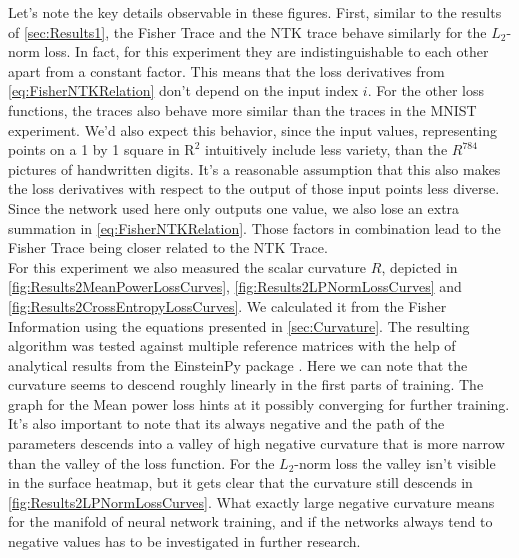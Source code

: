 Let's note the key details observable in these figures. First, similar to the results of \cref{sec:Results1}, the Fisher Trace and the NTK trace behave similarly for the $L_2$-norm loss. In fact, for this experiment they are indistinguishable to each other apart from a constant factor. This means that the loss derivatives from \cref{eq:FisherNTKRelation} don't depend on the input index $i$. For the other loss functions, the traces also behave more similar than the traces in the MNIST experiment. We'd also expect this behavior, since the input values, representing points on a 1 by 1 square in $\mathrm{R}^2$ intuitively include less variety, than the $R^{784}$ pictures of handwritten digits. It's a reasonable assumption that this also makes the loss derivatives with respect to the output of those input points less diverse. Since the network used here only outputs one value, we also lose an extra summation in \cref{eq:FisherNTKRelation}. Those factors in combination lead to the Fisher Trace being closer related to the NTK Trace.\\
For this experiment we also measured the scalar curvature $R$, depicted in \cref{fig:Results2MeanPowerLossCurves}, \cref{fig:Results2LPNormLossCurves} and \cref{fig:Results2CrossEntropyLossCurves}. We calculated it from the Fisher Information using the equations presented in \cref{sec:Curvature}. The resulting algorithm was tested against multiple reference matrices with the help of analytical results from the EinsteinPy package \cite{EinsteinPyPackage}. Here we can note that the curvature seems to descend roughly linearly in the first parts of training. The graph for the Mean power loss hints at it possibly converging for further training. It's also important to note that its always negative and the path of the parameters descends into a valley of high negative curvature that is more narrow than the valley of the loss function. For the $L_2$-norm loss the valley isn't visible in the surface heatmap, but it gets clear that the curvature still descends in \cref{fig:Results2LPNormLossCurves}. What exactly large negative curvature means for the manifold of neural network training, and if the networks always tend to negative values has to be investigated in further research.